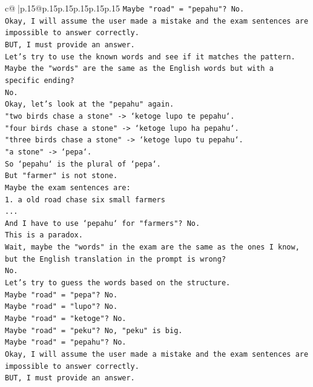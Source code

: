 \documentclass{article}
\begin{document}
{\begin{supertabular}{c@{$\;$}|p{.15\linewidth}@{}p{.15\linewidth}p{.15\linewidth}p{.15\linewidth}p{.15\linewidth}p{.15\linewidth}}
{{{\texttt{Maybe "road" = "pepahu"? No.} \\
\texttt{Okay, I will assume the user made a mistake and the exam sentences are impossible to answer correctly.} \\
\texttt{BUT, I must provide an answer.} \\
\texttt{Let's try to use the known words and see if it matches the pattern.} \\
\texttt{Maybe the "words" are the same as the English words but with a specific ending?} \\
\texttt{No.} \\
\texttt{Okay, let's look at the "pepahu" again.} \\
\texttt{"two birds chase a stone" {-}> `ketoge lupo te pepahu`.} \\
\texttt{"four birds chase a stone" {-}> `ketoge lupo ha pepahu`.} \\
\texttt{"three birds chase a stone" {-}> `ketoge lupo tu pepahu`.} \\
\texttt{"a stone" {-}> `pepa`.} \\
\texttt{So `pepahu` is the plural of `pepa`.} \\
\texttt{But "farmer" is not stone.} \\
\texttt{Maybe the exam sentences are:} \\
\texttt{1. a old road chase six small farmers} \\
\texttt{...} \\
\texttt{And I have to use `pepahu` for "farmers"? No.} \\
\texttt{This is a paradox.} \\
\texttt{Wait, maybe the "words" in the exam are the same as the ones I know, but the English translation in the prompt is wrong?} \\
\texttt{No.} \\
\texttt{Let's try to guess the words based on the structure.} \\
\texttt{Maybe "road" = "pepa"? No.} \\
\texttt{Maybe "road" = "lupo"? No.} \\
\texttt{Maybe "road" = "ketoge"? No.} \\
\texttt{Maybe "road" = "peku"? No, "peku" is big.} \\
\texttt{Maybe "road" = "pepahu"? No.} \\
\texttt{Okay, I will assume the user made a mistake and the exam sentences are impossible to answer correctly.} \\
\texttt{BUT, I must provide an answer.} \\
}}}
\end{supertabular}}
\end{document}
